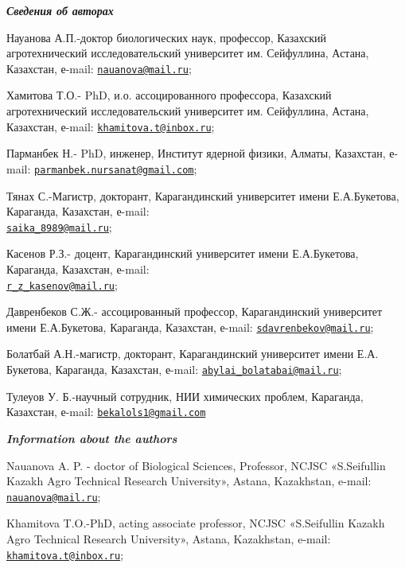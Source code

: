 \begin{authorinfo}
\emph{{\bfseries Сведения об авторах}}

Науанова А.П.-доктор биологических наук, профессор, Казахский
агротехнический исследовательский университет им. Сейфуллина, Астана,
Казахстан, е-mail:
\href{mailto:nauanova@mail.ru}{\nolinkurl{nauanova@mail.ru}};

Хамитова Т.О.- PhD, и.о. ассоцированного профессора, Казахский
агротехнический исследовательский университет им. Сейфуллина, Астана,
Казахстан, е-mail:
\href{mailto:khamitova.t@inbox.ru}{\nolinkurl{khamitova.t@inbox.ru}};

Парманбек Н.- PhD, инженер, Институт ядерной физики, Алматы, Казахстан,
е-mail:
\href{mailto:parmanbek.nursanat@gmail.com}{\nolinkurl{parmanbek.nursanat@gmail.com}};

Тянах С.-Магистр, докторант, Карагандинский университет имени
Е.А.Букетова, Караганда, Казахстан, е-mail:\\
\href{mailto:saika_8989@mail.ru}{\nolinkurl{saika\_8989@mail.ru}};

Касенов Р.З.- доцент, Карагандинский университет имени Е.А.Букетова,
Караганда, Казахстан, е-mail:\\
\href{mailto:r_z_kasenov@mail.ru}{\nolinkurl{r\_z\_kasenov@mail.ru}};

Давренбеков С.Ж.- ассоцированный профессор, Карагандинский университет
имени Е.А.Букетова, Караганда, Казахстан, е-mail:
\href{mailto:sdavrenbekov@mail.ru}{\nolinkurl{sdavrenbekov@mail.ru}};

Болатбай А.Н.-магистр, докторант, Карагандинский университет имени Е.А.
Букетова, Караганда, Казахстан, е-mail:
\href{mailto:abylai_bolatabai@mail.ru}{\nolinkurl{abylai\_bolatabai@mail.ru}};

Тулеуов У. Б.-научный сотрудник, НИИ химических проблем, Караганда,
Казахстан, е-mail:
\href{mailto:bekalols1@gmail.com}{\nolinkurl{bekalols1@gmail.com}}

\emph{{\bfseries Information about the authors}}

Nauanova A. P. - doctor of Biological Sciences, Professor, NCJSC
«S.Seifullin Kazakh Agro Technical Research University», Astana,
Kazakhstan, e-mail:
\href{mailto:nauanova@mail.ru}{\nolinkurl{nauanova@mail.ru}};

Khamitova T.O.-PhD, acting associate professor, NCJSC «S.Seifullin
Kazakh Agro Technical Research University», Astana, Kazakhstan, e-mail:
\href{mailto:khamitova.t@inbox.ru}{\nolinkurl{khamitova.t@inbox.ru}};


\end{authorinfo}

